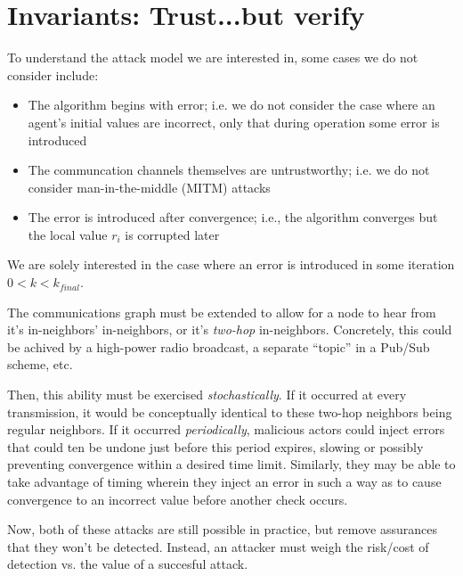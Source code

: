 \documentclass[11pt]{article}
\begin{document}
\section{Invariants: Trust...but verify}
To understand the attack model we are interested in, some cases we do not consider include:
\begin{itemize}
    \item The algorithm begins with error; i.e. we do not consider the case
          where an agent's initial values are incorrect, only that during operation
          some error is introduced
    \item The communcation channels themselves are untrustworthy; i.e. we do not
          consider man-in-the-middle (MITM) attacks
    \item The error is introduced after convergence; i.e., the algorithm
          converges but the local value $r_i$ is corrupted later
\end{itemize}
We are solely interested in the case where an error is introduced in some iteration $0<k<k_{final}$.

The communications graph must be extended to allow for a node to hear from it's
in-neighbors' in-neighbors, or it's \textit{two-hop} in-neighbors. Concretely,
this could be achived by a high-power radio broadcast, a separate ``topic'' in a
Pub/Sub scheme, etc.

Then, this ability must be exercised \textit{stochastically}. If it occurred at
every transmission, it would be conceptually identical to these two-hop
neighbors being regular neighbors. If it occurred \textit{periodically}, malicious
actors could inject errors that could ten be undone just before this period expires,
slowing or possibly preventing convergence within a desired time limit. Similarly, they may
be able to take advantage of timing wherein they inject an error in such a way as to
cause convergence to an incorrect value before another check occurs.

Now, both of these attacks are still possible in practice, but remove assurances
that they won't be detected. Instead, an attacker must weigh the risk/cost of
detection vs. the value of a succesful attack.
\end{document}
